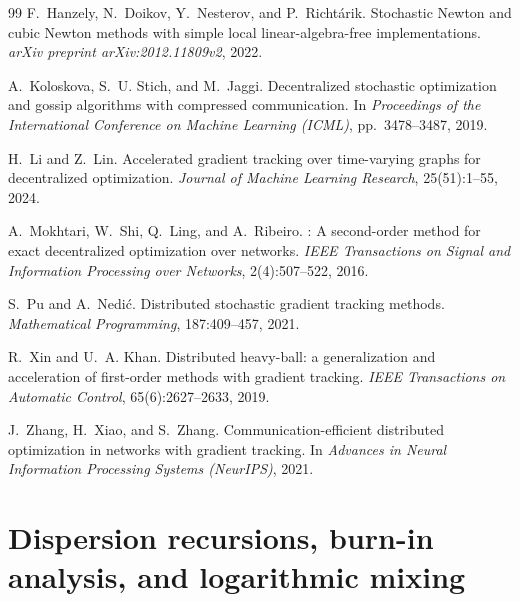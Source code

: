 \documentclass[review,onefignum,onetabnum]{siamart171218}
\begin{document}
\begin{thebibliography}{99}
		F.~Hanzely, N.~Doikov, Y.~Nesterov, and P.~Richt{\'a}rik.
		\newblock Stochastic Newton and cubic Newton methods with simple local linear-algebra-free implementations.
		\newblock \emph{arXiv preprint arXiv:2012.11809v2}, 2022.
		
		A.~Koloskova, S.~U. Stich, and M.~Jaggi.
		\newblock Decentralized stochastic optimization and gossip algorithms with compressed communication.
		\newblock In \emph{Proceedings of the International Conference on Machine Learning (ICML)}, pp.~3478--3487, 2019.
		
		H.~Li and Z.~Lin.
		\newblock Accelerated gradient tracking over time-varying graphs for decentralized optimization.
		\newblock \emph{Journal of Machine Learning Research}, 25(51):1--55, 2024.
		
		A.~Mokhtari, W.~Shi, Q.~Ling, and A.~Ribeiro.
		: A second-order method for exact decentralized optimization over networks.
		\newblock \emph{IEEE Transactions on Signal and Information Processing over Networks}, 2(4):507--522, 2016.
		
		S.~Pu and A.~Nedi{\'c}.
		\newblock Distributed stochastic gradient tracking methods.
		\newblock \emph{Mathematical Programming}, 187:409--457, 2021.
		
		R.~Xin and U.~A. Khan.
		\newblock Distributed heavy-ball: a generalization and acceleration of first-order methods with gradient tracking.
		\newblock \emph{IEEE Transactions on Automatic Control}, 65(6):2627--2633, 2019.
		
		J.~Zhang, H.~Xiao, and S.~Zhang.
		\newblock Communication-efficient distributed optimization in networks with gradient tracking.
		\newblock In \emph{Advances in Neural Information Processing Systems (NeurIPS)}, 2021.
		
	\end{thebibliography}

\appendix

\section{Dispersion recursions, burn-in analysis, and logarithmic mixing}\label{app:dispersion}
\end{document}
